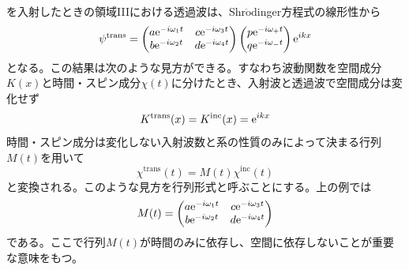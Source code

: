 を入射したときの領域IIIにおける透過波は、Shr$\ddot{\mathrm{o}}$dinger方程式の線形性から
\begin{equation}
\psi^{\mathrm{trans}}=\begin{pmatrix} a\mathrm{e}^{-i\omega_1t} & c\mathrm{e}^{-i\omega_3t} \\ b\mathrm{e}^{-i\omega_2t} & d\mathrm{e}^{-i\omega_4t} \end{pmatrix} \begin{pmatrix} p\mathrm{e}^{-i\omega_+t} \\ q\mathrm{e}^{-i\omega_-t}\end{pmatrix} \mathrm{e}^{ikx}
\end{equation}
となる。この結果は次のような見方ができる。すなわち波動関数を空間成分$K(x)$と時間・スピン成分$\chi(t)$に分けたとき、入射波と透過波で空間成分は変化せず
\begin{equation}
K^\mathrm{trans}(x)=K^\mathrm{inc}(x)=\mathrm{e}^{ikx}
\end{equation}
時間・スピン成分は変化しない入射波数と系の性質のみによって決まる行列$M(t)$を用いて
\begin{equation}
\chi^\mathrm{trans}(t)=M(t) \chi^\mathrm{inc}(t)
\end{equation}
と変換される。このような見方を行列形式と呼ぶことにする。上の例では
\begin{equation}
M(t)=\begin{pmatrix} a\mathrm{e}^{-i\omega_1t} & c\mathrm{e}^{-i\omega_3t} \\ b\mathrm{e}^{-i\omega_2t} & d\mathrm{e}^{-i\omega_4t} \end{pmatrix}
\end{equation}
である。ここで行列$M(t)$が時間のみに依存し、空間に依存しないことが重要な意味をもつ。

